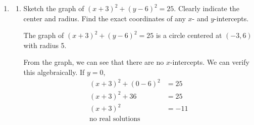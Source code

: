 \documentclass{article}
\begin{document}
\begin{enumerate}
\begin{enumerate}
    \begin{solution}
            The graph of $x^2+y^2=9$ is a circle centered at the origin with radius 3.
    \begin{center}
    \end{center}
    The $x$-intercepts are $(-3,0)$ and $(3,0)$. The $y$-intercepts at $(0,-3)$ and $(0,3)$. We can see these from the graph, but we can also find them algebraically by setting $y=0$ and $x=0$. If $y=0$, then $x^2=9$, and the solutions are $x=\pm3$. If $x=0$, then $y^2=9$, and the solutions are $y\pm3$.
    \end{solution}

    \item
    \begin{enumerate}
    \item
    \begin{problem}
        Sketch the graph of $(x+3)^2+(y-6)^2=25$. Clearly indicate the center and radius. Find the exact coordinates of any $x$- and $y$-intercepts.
    \end{problem}
    \pspace{\vfill}

        \begin{solution}
            The graph of $(x+3)^2+(y-6)^2=25$ is a circle centered at $(-3,6)$ with radius 5.
    \begin{center}
    \end{center}
    From the graph, we can see that there are no $x$-intercepts. We can verify this algebraically. If $y=0$,
    \begin{align*}
        (x+3)^2 + (0-6)^2 &= 25\\
        (x+3)^2 + 36 &= 25 \\
        (x+3)^2 &= -11\\
        \text{no real solutions}
    \end{align*}


\end{solution}
\end{enumerate}
\end{enumerate}
\end{enumerate}
\end{document}
